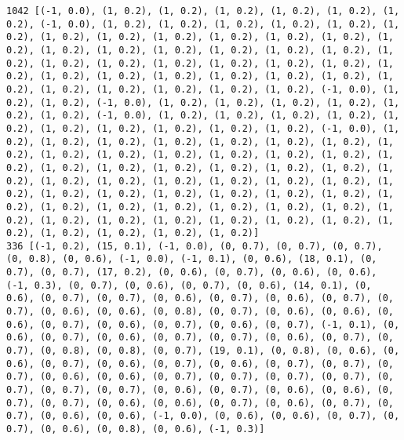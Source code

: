 \documentclass[11pt]{article}
\begin{document}
\begin{Verbatim}[commandchars=\\\{\}]
1042 [(-1, 0.0), (1, 0.2), (1, 0.2), (1, 0.2), (1, 0.2), (1, 0.2), (1, 0.2), (-1, 0.0), (1, 0.2), (1, 0.2), (1, 0.2), (1, 0.2), (1, 0.2), (1, 0.2), (1, 0.2), (1, 0.2), (1, 0.2), (1, 0.2), (1, 0.2), (1, 0.2), (1, 0.2), (1, 0.2), (1, 0.2), (1, 0.2), (1, 0.2), (1, 0.2), (1, 0.2), (1, 0.2), (1, 0.2), (1, 0.2), (1, 0.2), (1, 0.2), (1, 0.2), (1, 0.2), (1, 0.2), (1, 0.2), (1, 0.2), (1, 0.2), (1, 0.2), (1, 0.2), (1, 0.2), (1, 0.2), (1, 0.2), (1, 0.2), (1, 0.2), (1, 0.2), (1, 0.2), (-1, 0.0), (1, 0.2), (1, 0.2), (-1, 0.0), (1, 0.2), (1, 0.2), (1, 0.2), (1, 0.2), (1, 0.2), (1, 0.2), (-1, 0.0), (1, 0.2), (1, 0.2), (1, 0.2), (1, 0.2), (1, 0.2), (1, 0.2), (1, 0.2), (1, 0.2), (1, 0.2), (1, 0.2), (-1, 0.0), (1, 0.2), (1, 0.2), (1, 0.2), (1, 0.2), (1, 0.2), (1, 0.2), (1, 0.2), (1, 0.2), (1, 0.2), (1, 0.2), (1, 0.2), (1, 0.2), (1, 0.2), (1, 0.2), (1, 0.2), (1, 0.2), (1, 0.2), (1, 0.2), (1, 0.2), (1, 0.2), (1, 0.2), (1, 0.2), (1, 0.2), (1, 0.2), (1, 0.2), (1, 0.2), (1, 0.2), (1, 0.2), (1, 0.2), (1, 0.2), (1, 0.2), (1, 0.2), (1, 0.2), (1, 0.2), (1, 0.2), (1, 0.2), (1, 0.2), (1, 0.2), (1, 0.2), (1, 0.2), (1, 0.2), (1, 0.2), (1, 0.2), (1, 0.2), (1, 0.2), (1, 0.2), (1, 0.2), (1, 0.2), (1, 0.2), (1, 0.2), (1, 0.2), (1, 0.2), (1, 0.2), (1, 0.2)]
336 [(-1, 0.2), (15, 0.1), (-1, 0.0), (0, 0.7), (0, 0.7), (0, 0.7), (0, 0.8), (0, 0.6), (-1, 0.0), (-1, 0.1), (0, 0.6), (18, 0.1), (0, 0.7), (0, 0.7), (17, 0.2), (0, 0.6), (0, 0.7), (0, 0.6), (0, 0.6), (-1, 0.3), (0, 0.7), (0, 0.6), (0, 0.7), (0, 0.6), (14, 0.1), (0, 0.6), (0, 0.7), (0, 0.7), (0, 0.6), (0, 0.7), (0, 0.6), (0, 0.7), (0, 0.7), (0, 0.6), (0, 0.6), (0, 0.8), (0, 0.7), (0, 0.6), (0, 0.6), (0, 0.6), (0, 0.7), (0, 0.6), (0, 0.7), (0, 0.6), (0, 0.7), (-1, 0.1), (0, 0.6), (0, 0.7), (0, 0.6), (0, 0.7), (0, 0.7), (0, 0.6), (0, 0.7), (0, 0.7), (0, 0.8), (0, 0.8), (0, 0.7), (19, 0.1), (0, 0.8), (0, 0.6), (0, 0.6), (0, 0.7), (0, 0.6), (0, 0.7), (0, 0.6), (0, 0.7), (0, 0.7), (0, 0.7), (0, 0.6), (0, 0.6), (0, 0.7), (0, 0.7), (0, 0.7), (0, 0.7), (0, 0.7), (0, 0.7), (0, 0.7), (0, 0.6), (0, 0.7), (0, 0.6), (0, 0.6), (0, 0.7), (0, 0.7), (0, 0.6), (0, 0.6), (0, 0.7), (0, 0.6), (0, 0.7), (0, 0.7), (0, 0.6), (0, 0.6), (-1, 0.0), (0, 0.6), (0, 0.6), (0, 0.7), (0, 0.7), (0, 0.6), (0, 0.8), (0, 0.6), (-1, 0.3)]

\end{Verbatim}
\end{document}

